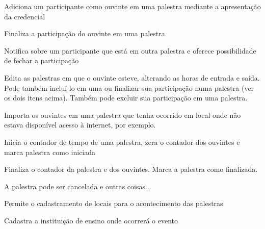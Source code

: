 \documentclass[12pt,a4paper]{article}
\begin{document}
        	{Adiciona um participante como ouvinte em uma palestra mediante a apresentação da credencial}
        	{%
        	
        	}
			
        	{Finaliza a participação do ouvinte em uma palestra}
        	{%
        	
        	}
			
        	{Notifica sobre um participante que está em outra palestra e oferece possibilidade de fechar a participação}
        	{%
        	
        	}
			
        	{Edita as palestras em que o ouvinte esteve, alterando as horas de entrada e saída. Pode também incluí-lo em uma ou finalizar sua participação numa palestra (ver os dois itens acima). Também pode excluir sua participação em uma palestra.}
        	{%
        	
        	}
						
			
        	{Importa os ouvintes em uma palestra que tenha ocorrido em local onde não estava disponível acesso à internet, por exemplo.}
        	{%
        	
        	}
			
        	{Inicia o contador de tempo de uma palestra, zera o contador dos ouvintes e marca palestra como iniciada}
        	{%
        	
        	}
			
        	{Finaliza o contador da palestra e dos ouvintes. Marca a palestra como finalizada.}
        	{%
        	
        	}
			
        	{A palestra pode ser cancelada e outras coisas...}
        	{%
        	
        	}
			
        	{Permite o cadastramento de locais para o acontecimento das palestras}
        	{%
        	
        	}
			
        	{Cadastra a instituição de ensino onde ocorrerá o evento}
        	{%
        	
        	}
					
\end{document}
